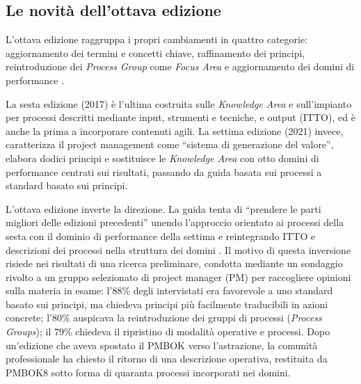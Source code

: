 \subsection{Le novit\`a dell'ottava edizione}

L'ottava edizione raggruppa i propri cambiamenti in quattro categorie:
aggiornamento dei termini e concetti chiave, raffinamento dei principi,
reintroduzione dei \emph{Process Group} come \emph{Focus Area} e aggiornamento
dei domini di performance \cite{pmbok8}.

La sesta edizione (2017) \`e l'ultima costruita sulle
\emph{Knowledge Area} e sull'impianto per processi descritti mediante input,
strumenti e tecniche, e output (ITTO), ed \`e anche la prima a incorporare
contenuti agili. La settima edizione (2021) invece, caratterizza il
project management come ``sistema di generazione del valore'', elabora dodici
principi e sostituisce le \emph{Knowledge Area} con otto domini di performance
centrati sui risultati, passando da guida basata sui processi a standard basato
sui principi.

L'ottava edizione inverte la direzione. La guida tenta di ``prendere le parti
migliori delle edizioni precedenti'' unendo l'approccio orientato ai processi
della sesta con il dominio di performance della settima e reintegrando ITTO e
descrizioni dei processi nella struttura dei domini \cite{pmbok8}.
Il motivo di questa inversione risiede nei risultati di una ricerca preliminare,
condotta mediante un sondaggio rivolto a un gruppo selezionato di project manager
(PM) per raccogliere opinioni sulla materia in esame:
l'88\% degli intervistati era favorevole a uno standard basato sui
principi, ma chiedeva principi pi\`u facilmente traducibili in azioni concrete;
l'80\% auspicava la reintroduzione dei gruppi di processi
(\emph{Process Groups});
il 79\% chiedeva il ripristino di modalit\`a operative e processi.
Dopo un'edizione che aveva spostato il PMBOK verso l'astrazione, la
comunit\`a professionale ha chiesto il ritorno di una descrizione operativa,
restituita da PMBOK8 sotto forma di quaranta processi incorporati nei domini.

